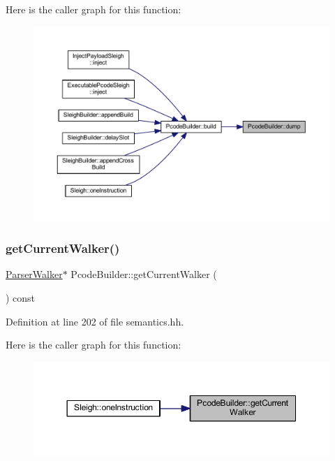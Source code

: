 Here is the caller graph for this function\+:
\nopagebreak
\begin{figure}[H]
\begin{center}
\leavevmode
\includegraphics[width=350pt]{class_pcode_builder_afda63f1d79357bca4e63e92bded60559_icgraph}
\end{center}
\end{figure}
\mbox{\label{class_pcode_builder_a65861c5e4b12ae6704376d38e4b15fc0}} 
\subsubsection{\texorpdfstring{getCurrentWalker()}{getCurrentWalker()}}
{\footnotesize\ttfamily \mbox{\hyperlink{class_parser_walker}{Parser\+Walker}}$\ast$ Pcode\+Builder\+::get\+Current\+Walker (\begin{DoxyParamCaption}{ }\end{DoxyParamCaption}) const\hspace{0.3cm}{\ttfamily [inline]}}



Definition at line 202 of file semantics.\+hh.

Here is the caller graph for this function\+:
\nopagebreak
\begin{figure}[H]
\begin{center}
\leavevmode
\includegraphics[width=350pt]{class_pcode_builder_a65861c5e4b12ae6704376d38e4b15fc0_icgraph}
\end{center}
\end{figure}
\mbox{\label{class_pcode_builder_a3323d18944e86830774bfc49a0821dd0}} 
